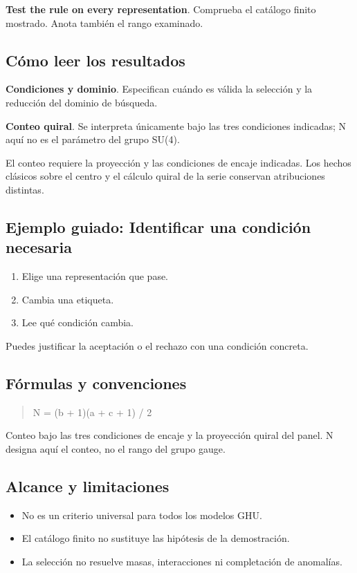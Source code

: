 \documentclass[11pt,a4paper]{article}
\begin{document}
\textbf{Test the rule on every representation}. Comprueba el catálogo finito mostrado. Anota también el rango examinado.

\subsection*{Cómo leer los resultados}
\textbf{Condiciones y dominio}. Especifican cuándo es válida la selección y la reducción del dominio de búsqueda.

\textbf{Conteo quiral}. Se interpreta únicamente bajo las tres condiciones indicadas; N aquí no es el parámetro del grupo SU(4).

El conteo requiere la proyección y las condiciones de encaje indicadas. Los hechos clásicos sobre el centro y el cálculo quiral de la serie conservan atribuciones distintas.
\subsection*{Ejemplo guiado: Identificar una condición necesaria}
\begin{enumerate}
\item Elige una representación que pase.
\item Cambia una etiqueta.
\item Lee qué condición cambia.
\end{enumerate}
Puedes justificar la aceptación o el rechazo con una condición concreta.
\subsection*{Fórmulas y convenciones}
\begin{quote}N = (b + 1)(a + c + 1) / 2\end{quote}
Conteo bajo las tres condiciones de encaje y la proyección quiral del panel. N designa aquí el conteo, no el rango del grupo gauge.

\subsection*{Alcance y limitaciones}
\begin{itemize}
\item No es un criterio universal para todos los modelos GHU.
\item El catálogo finito no sustituye las hipótesis de la demostración.
\item La selección no resuelve masas, interacciones ni completación de anomalías.
\end{itemize}
\end{document}
